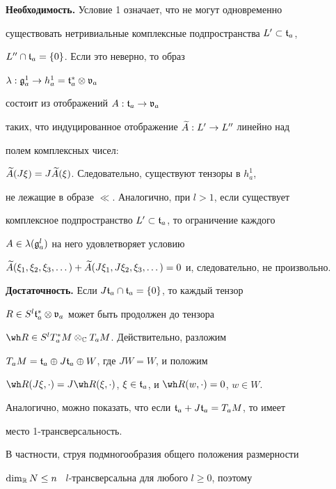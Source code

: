 \begin{pf}


{\bf Необходимость.} Условие 1 означает, что не могут одновременно


существовать нетривиальные комплексные подпространства $L'\subset{\frak t}_a$,


$L''\cap{\frak t}_a=\{0\}$. Если это неверно, то образ


$\lambda:{\frak g}_a^1\to h_a^1={\frak t}_a^*\otimes{\frak v}_a$


состоит из отображений $A:{\frak t}_a\to{\frak v}_a$


таких, что индуцированное отображение $\widetilde A:L'\to L''$ линейно над


полем комплексных чисел:


$\widetilde A(J\xi)=J\widetilde A(\xi)$. Следовательно, существуют тензоры в $h_a^1$,


не лежащие в образе $\ll$. Аналогично, при $l>1$, если существует


комплексное подпространство $L'\subset{\frak t}_a$, то ограничение каждого


$A\in\lambda({\frak g}_a^l)$ на него удовлетворяет условию


$\ti A(\x_1,\x_2,\x_3,\dotsc)+ \ti


A(J\x_1,J\x_2,\x_3,\dotsc)=0$ и, следовательно, не произвольно.


\smallskip





{\bf Достаточность.} Если $J{\frak t}_a\cap{\frak t}_a=\{0\}$, то каждый тензор


$R\in S^l{\frak t}^*_a\otimes{\frak v}_a$ может быть продолжен до тензора


$\wh R\in S^lT^*_aM\ot_\CC T_aM$. Действительно, разложим


$T_aM={\frak t}_a\oplus J{\frak t}_a\oplus W$, где $JW=W$, и положим


$\wh R(J\x,\cdot)=J\wh R(\x,\cdot)$, $\x\in\tf_a$, и $\wh


R(w,\cdot)=0$, $w\in W$.


Аналогично, можно показать, что если ${\frak t}_a+J{\frak t}_a=T_aM$, то имеет


место 1-трансверсальность.


\end{pf}








В частности, струя подмногообразия общего положения размерности


$\dim_{{\Bbb R}} N\le n$ \ $l$-транс\-вер\-саль\-на для любого $l\ge0$, поэтому


